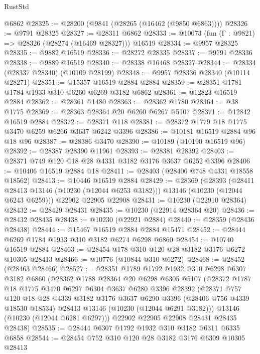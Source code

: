 \begin{lexlean}{RustStd}
\begin{coremodule}
    @6862
@28325 := @28200 (@9841 (@28265 (@16462 (@9850 @6863))))
@28326 := @9791 @28325
@28327 := @28311 @6862
@28333 := @10073 (fun (Γ : @9821) => @28326 (@28274 (@16469 @28327))) @16519
@28334 := @9957 @28325
@28335 := @9882 @16519
@28336 := @28272 @28335
@28337 := @9791 @28336
@28338 := @9889 @16519
@28340 := @28338 @16468 @28327
@28344 := @28334 (@28337 @28340) (@10109 @28199)
@28348 := @9957 @28336 @28340 (@10114 @28271)
@28351 := @15357 @16519 @2884 @2884
@28359 := @28351 @1781 @1784 @1933 @310 @6260 @6269 @3182 @6862
@28361 := @12823 @16519 @2884
@28362 := @28361 @1480
@28363 := @28362 @1780
@28364 := @38 @1775
@28369 := @28363 @28364 @20 @6260 @6267 @5107
@28371 := @12842 @16519 @2884
@28372 := @28371 @118
@28381 := @28372 @1779 @18 @1775 @3470 @6259 @6266 @3637 @6242 @3396
@28386 := @10181 @16519 @2884 @96 @18 @96
@28387 := @28386 @3470
@28390 := @10189 (@10190 @16519 @96)
@28392 := @28387 @28390 @11961
@28393 := @28381 @28392
@28403 := @28371 @749 @120 @18 @28 @4331 @3182 @3176 @3637 @6252 @3396
@28406 := @10406 @16519 @2884 @18
@28411 := @28403 (@28406 @748 @4331 @18558 @18562)
@28413 := @10446 @16519 @2884
@28429 := @28369
    (@28393
      (@28411 @28413 @13146 (@10230 (@12044 @6253 @3182)))
      @13146
      (@10230 (@12044 @6243 @6259)))
    @22902
    @22905
    @22908
@28431 := @10230 (@22910 @28364)
@28432 := @28429 @28431
@28435 := @10230 (@22914 @28364 @20)
@28436 := @28432 @28435
@28438 := @10230 (@22921 @2884)
@28440 := @28359 (@28436 @28438)
@28444 := @15467 @16519 @2884 @2884 @15471
@28452 := @28444 @6269 @1784 @1933 @310 @3182 @6274 @6298 @6860
@28454 := @10740 @16519 @2884
@28463 := @28454 @178 @310 @120 @28 @3182 @3176 @6272 @10305 @28413
@28466 := @10776 (@10844 @310 @6272)
@28468 := @28452 (@28463 @28466)
@28527 := @28351
    @1789
    @1792
    @1932
    @310
    @6298
    @6307
    @3182
    @6860
    (@28362
      @1788
      @28364
      @20
      @6298
      @6305
      @5107
      (@28372
        @1787
        @18
        @1775
        @3470
        @6297
        @6304
        @3637
        @6280
        @3396
        @28392
        (@28371
          @757
          @120
          @18
          @28
          @4339
          @3182
          @3176
          @3637
          @6290
          @3396
          (@28406 @756 @4339 @18530 @18534)
          @28413
          @13146
          (@10230 (@12044 @6291 @3182)))
        @13146
        (@10230 (@12044 @6281 @6297)))
      @22902
      @22905
      @22908
      @28431
      @28435
      @28438)
@28535 := @28444 @6307 @1792 @1932 @310 @3182 @6311 @6335 @6858
@28544 := @28454 @752 @310 @120 @28 @3182 @3176 @6309 @10305 @28413

\end{coremodule}
\end{lexlean}
